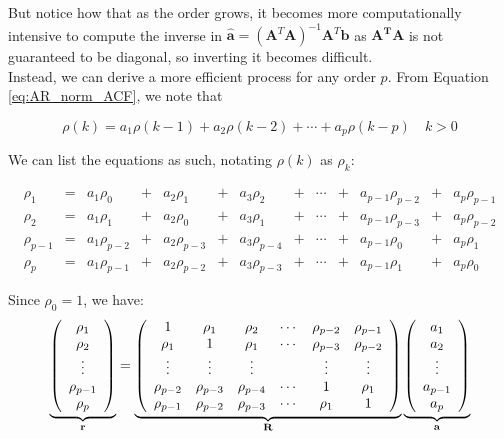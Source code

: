 But notice how that as the order grows, it becomes more computationally intensive to compute the inverse in $\hat{\mathbf{a}}=\left(\mathbf{A}^T\mathbf{A}\right)^{-1}\mathbf{A}^T\mathbf{b}$ as $\mathbf{A^TA}$ is not guaranteed to be diagonal, so inverting it becomes difficult.\\

Instead, we can derive a more efficient process for any order $p$. From Equation \ref{eq:AR_norm_ACF}, we note that 

\begin{equation*}
    \rho(k)=a_1\rho(k-1)+a_2\rho(k-2)+\cdots+a_p\rho(k-p)\quad k>0
\end{equation*}

We can list the equations as such, notating $\rho(k)$ as $\rho_k$:

\begin{align*}
\rho_1 &= &a_1\rho_0 &+ &a_2\rho_1 &+ &a_3\rho_2 &+ &\cdots &+ &a_{p-1}\rho_{p-2} &+ &a_p\rho_{p-1} \\
\rho_2 &= &a_1\rho_1 &+ &a_2\rho_0 &+ &a_3\rho_1 &+ &\cdots &+ &a_{p-1}\rho_{p-3} &+ &a_p\rho_{p-2} \\
\rho_{p-1} &= &a_1\rho_{p-2} &+ &a_2\rho_{p-3} &+ &a_3\rho_{p-4} &+ &\cdots &+ &a_{p-1}\rho_0 &+ &a_p\rho_1 \\
\rho_p &= &a_1\rho_{p-1} &+ &a_2\rho_{p-2} &+ &a_3\rho_{p-3} &+ &\cdots &+ &a_{p-1}\rho_1 &+ &a_p\rho_0
\end{align*}


Since $\rho_0 = 1$, we have:
\begin{equation}\label{eq:YW}
\underbrace{
\left(\begin{array}{c}
\rho_1 \\
\rho_2 \\
\vdots \\
\rho_{p-1} \\
\rho_p
\end{array}\right)}_{\mathbf{r}} = 
\underbrace{\left(\begin{array}{cccccc}
1 & \rho_1 & \rho_2 & \cdots & \rho_{p-2} & \rho_{p-1} \\
\rho_1 & 1 & \rho_1 & \cdots & \rho_{p-3} & \rho_{p-2} \\
\vdots & \vdots & \vdots & & \vdots & \vdots \\
\rho_{p-2} & \rho_{p-3} & \rho_{p-4} & \cdots & 1 & \rho_1 \\
\rho_{p-1} & \rho_{p-2} & \rho_{p-3} & \cdots & \rho_1 & 1
\end{array}\right)}_{\mathbf{R}}
\underbrace{\left(\begin{array}{c}
a_1 \\
a_2 \\
\vdots \\
a_{p-1} \\
a_p
\end{array}\right)}_{\mathbf{a}}
\end{equation}


